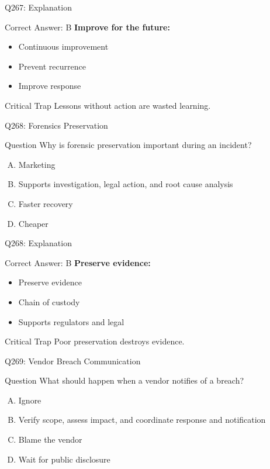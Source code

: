 \documentclass{beamer}
\begin{document}
	\begin{frame}{Q267: Explanation}
		\begin{block}{Correct Answer: B}
			\textbf{Improve for the future:}
			\begin{itemize}
				\item Continuous improvement
				\item Prevent recurrence
				\item Improve response
			\end{itemize}
		\end{block}
		\begin{alertblock}{Critical Trap}
			Lessons without action are wasted learning.
		\end{alertblock}
	\end{frame}
	
	\begin{frame}{Q268: Forensics Preservation}
		\begin{block}{Question}
			Why is forensic preservation important during an incident?
		\end{block}
		\begin{enumerate}[(A)]
			\item Marketing
			\item Supports investigation, legal action, and root cause analysis
			\item Faster recovery
			\item Cheaper
		\end{enumerate}
	\end{frame}
	
	\begin{frame}{Q268: Explanation}
		\begin{block}{Correct Answer: B}
			\textbf{Preserve evidence:}
			\begin{itemize}
				\item Preserve evidence
				\item Chain of custody
				\item Supports regulators and legal
			\end{itemize}
		\end{block}
		\begin{alertblock}{Critical Trap}
			Poor preservation destroys evidence.
		\end{alertblock}
	\end{frame}
	
	\begin{frame}{Q269: Vendor Breach Communication}
		\begin{block}{Question}
			What should happen when a vendor notifies of a breach?
		\end{block}
		\begin{enumerate}[(A)]
			\item Ignore
			\item Verify scope, assess impact, and coordinate response and notification
			\item Blame the vendor
			\item Wait for public disclosure
		\end{enumerate}
	\end{frame}
	
\end{document}
